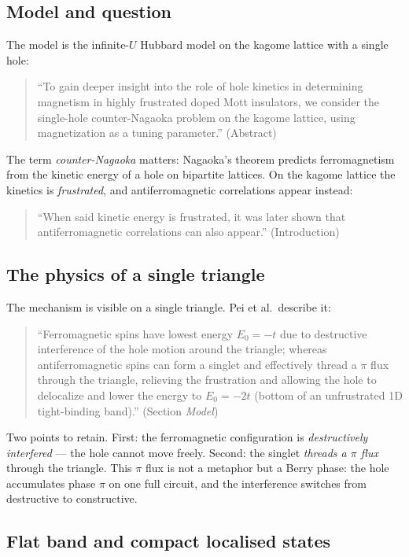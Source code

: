 \subsection{Model and question}

The model is the infinite-$U$ Hubbard model on the kagome lattice with a
single hole:
\begin{quote}\QM
``To gain deeper insight into the role of hole kinetics in determining
magnetism in highly frustrated doped Mott insulators, we consider the
single-hole counter-Nagaoka problem on the kagome lattice, using magnetization
as a tuning parameter.'' (Abstract)
\end{quote}
The term \emph{counter-Nagaoka} matters: Nagaoka's theorem predicts
ferromagnetism from the kinetic energy of a hole on bipartite lattices. On
the kagome lattice the kinetics is \emph{frustrated}, and antiferromagnetic
correlations appear instead:
\begin{quote}\QM
``When said kinetic energy is frustrated, it was later shown that
antiferromagnetic correlations can also appear.'' (Introduction)
\end{quote}

\subsection{The physics of a single triangle}

The mechanism is visible on a single triangle. Pei et al.\ describe it:
\begin{quote}\QM
``Ferromagnetic spins have lowest energy $E_0=-t$ due to destructive
interference of the hole motion around the triangle; whereas antiferromagnetic
spins can form a singlet and effectively thread a $\pi$ flux through the
triangle, relieving the frustration and allowing the hole to delocalize and
lower the energy to $E_0=-2t$ (bottom of an unfrustrated 1D tight-binding
band).'' (Section \emph{Model})
\end{quote}
Two points to retain. First: the ferromagnetic configuration is
\emph{destructively interfered} --- the hole cannot move freely. Second: the
singlet \emph{threads a $\pi$ flux} through the triangle. This $\pi$ flux is
not a metaphor but a Berry phase: the hole accumulates phase $\pi$ on one
full circuit, and the interference switches from destructive to
constructive.

\subsection{Flat band and compact localised states}


